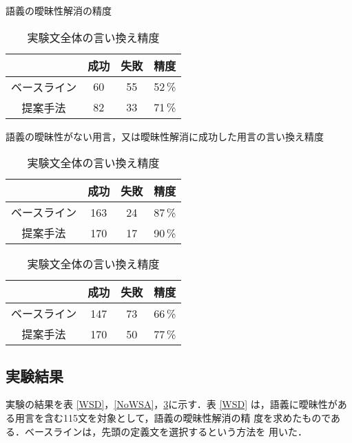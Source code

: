 \begin{table}[t]

 \caption{語義の曖昧性解消の精度}
 \label{WSD}
 
 \begin{center}
 \begin{tabular}{cccc} \hline
	     &  成功  & 失敗  &  精度    \\ \hline
ベースライン &    60  &    55 &  52\,\% \\ 
  提案手法   &    82  &    33 &  71\,\% \\ \hline
 \end{tabular}
 \end{center}
 
 \vspace{3pt}  

 \caption{語義の曖昧性がない用言，又は曖昧性解消に成功した用言の言い換え精度}
 \label{NoWSA}  
 
 \begin{center} 
 \begin{tabular}{cccc} \hline
             & 成功 & 失敗 & 精度 \\ \hline
ベースライン &  163 &   24 & 87\,\% \\ 
   提案手法  &  170 &   17 & 90\,\% \\ \hline
 \end{tabular}
 \end{center}    

 \vspace{3pt}  

 \caption{実験文全体の言い換え精度}
 \label{ALL}  
 
 \begin{center}  
 \begin{tabular}{cccc} \hline
             & 成功 & 失敗 & 精度    \\ \hline
ベースライン &  147 &   73 & 66\,\% \\ 
   提案手法  &  170 &   50 & 77\,\% \\ \hline
 \end{tabular}
 \end{center}

\end{table}



\subsection*{実験結果}

実験の結果を表 \ref{WSD}，\ref{NoWSA}，\ref{ALL}に示す．表 \ref{WSD}
は，語義に曖昧性がある用言を含む115文を対象として，語義の曖昧性解消の精
度を求めたものである．ベースラインは，先頭の定義文を選択するという方法を
用いた．

